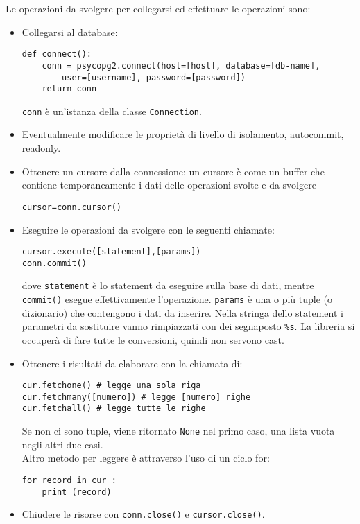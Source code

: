 \documentclass[a4paper, 10pt, titlepage]{article}
\begin{document}
	Le operazioni da svolgere per collegarsi ed effettuare le operazioni sono:
	\begin{itemize}
		\item Collegarsi al database:
		\begin{lstlisting}[frame=tb]
def connect():
	conn = psycopg2.connect(host=[host], database=[db-name],
		user=[username], password=[password])
	return conn
		\end{lstlisting}
		\lstinline|conn| è un'istanza della classe \lstinline|Connection|.
		
		\item Eventualmente modificare le proprietà di livello di isolamento, autocommit, readonly.
		\item Ottenere un cursore dalla connessione: un cursore è come un buffer che contiene temporaneamente i dati delle operazioni svolte e da svolgere
		\begin{lstlisting}[frame=tb]
cursor=conn.cursor()
		\end{lstlisting}
		
		\item Eseguire le operazioni da svolgere con le seguenti chiamate:
		\begin{lstlisting}[frame=tb]
cursor.execute([statement],[params])
conn.commit()
		\end{lstlisting}
		dove \lstinline|statement| è lo statement da eseguire sulla base di dati, mentre \lstinline|commit()| esegue effettivamente l'operazione. \lstinline|params| è una o più tuple (o dizionario) che contengono i dati da inserire. Nella stringa dello statement i parametri da sostituire vanno rimpiazzati con dei segnaposto \lstinline|%s|. La libreria si occuperà di fare tutte le conversioni, quindi non servono cast.
		
		\item Ottenere i risultati da elaborare con la chiamata di:
		\begin{lstlisting}[frame=tb]
cur.fetchone() # legge una sola riga
cur.fetchmany([numero]) # legge [numero] righe
cur.fetchall() # legge tutte le righe
		\end{lstlisting}
		Se non ci sono tuple, viene ritornato \lstinline|None| nel primo caso, una lista vuota negli altri due casi. \\
		Altro metodo per leggere è attraverso l'uso di un ciclo for:
		\begin{lstlisting}[frame=tb]
for record in cur :
	print (record)
		\end{lstlisting}
		
		\item Chiudere le risorse con \lstinline|conn.close()| e \lstinline|cursor.close()|.
	\end{itemize} \medskip
\end{document}
